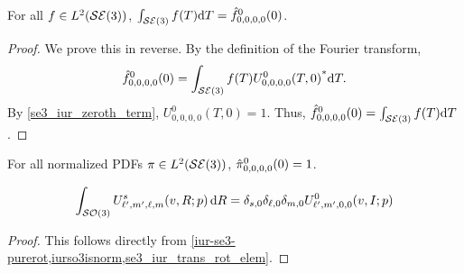 \documentclass[../../main.tex]{subfiles}
\begin{document}
\begin{refsection}
	\begin{theorem}
		For all $f \in L^2(\mathcal{SE} (3))$, $\int_{\mathcal{SE} (3)} f(T) \dd T = \hat{f}^0_{0,0,0,0}(0)$.
	\end{theorem}
	\begin{proof}
		We prove this in reverse.
		By the definition of the Fourier transform,
		$$\hat{f}^0_{0,0,0,0}(0) = \int_{\mathcal{SE} (3)} f(T) {U^0_{0,0,0,0}(T, 0)}^* \dd T.$$
		By \cref{se3_iur_zeroth_term}, $U^0_{0,0,0,0}(T, 0) = 1$.
		Thus, $\hat{f}^0_{0,0,0,0}(0) = \int_{\mathcal{SE} (3)} f(T) \dd T$.
	\end{proof}

	\begin{corollary}
		For all normalized PDFs $\pi \in L^2(\mathcal{SE} (3))$, $\hat{\pi}^0_{0,0,0,0}(0) = 1$.
	\end{corollary}

	\begin{theorem}
		$$\int_{\mathcal{SO} (3)} U^s_{\ell',m',\ell,m}(v, R; p) \dd{R} = \delta_{s,0} \delta_{\ell,0} \delta_{m,0} U^0_{\ell',m',0,0}(v, I; p)$$
	\end{theorem}
	\begin{proof}
		This follows directly from \cref{iur-se3-purerot,iurso3isnorm,se3_iur_trans_rot_elem}.
	\end{proof}


\end{refsection}
\end{document}
